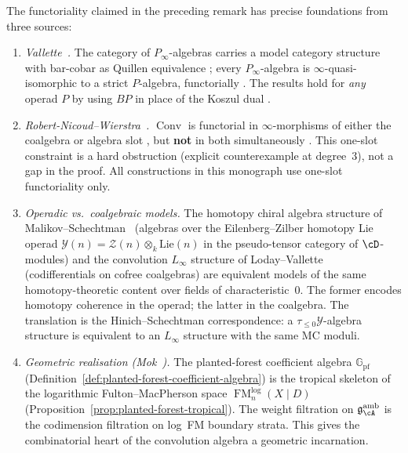 \begin{remark}
\label{rem:conv-functoriality-infrastructure}
The functoriality claimed in the preceding remark has precise
foundations from three sources:
\begin{enumerate}[label=\textup{(\roman*)}]
\item \emph{Vallette~\cite{Val16}.}
 The category of $P_\infty$-algebras carries a model category
 structure with bar-cobar as Quillen equivalence
 \cite[Theorem~2.1]{Val16}; every $P_\infty$-algebra is
 $\infty$-quasi-isomorphic to a strict $P$-algebra, functorially
 \cite[Theorem~1.2]{Val16}. The results hold for \emph{any}
 operad $P$ by using $BP$ in place of the Koszul dual
 \cite[\S1.6]{Val16}.
\item \emph{Robert-Nicoud--Wierstra~\cite{RNW19}.}
 $\operatorname{Conv}$ is functorial in $\infty$-morphisms of
 either the coalgebra or algebra slot
 \cite[Theorem~5.1]{RNW19}, but \textbf{not} in both
 simultaneously \cite[Theorem~6.6]{RNW19}. This one-slot
 constraint is a hard obstruction (explicit counterexample at
 degree~$3$), not a gap in the proof. All constructions in this
 monograph use one-slot functoriality only.
\item \emph{Operadic vs.\ coalgebraic models.}
 The homotopy chiral algebra structure of
 Malikov--Schechtman~\cite{MS24} (algebras over the Eilenberg--Zilber
 homotopy Lie operad
 $\mathcal{Y}(n) = \mathcal{Z}(n) \otimes_k \mathrm{Lie}(n)$
 in the pseudo-tensor category of $\cD$-modules) and the convolution
 $L_\infty$ structure of Loday--Vallette~\cite{LV12} (codifferentials
 on cofree coalgebras) are equivalent models of the same
 homotopy-theoretic content over fields of characteristic~$0$.
 The former encodes homotopy coherence in the operad; the latter
 in the coalgebra. The translation is the
 Hinich--Schechtman correspondence: a
 $\tau_{\leq 0}\mathcal{Y}$-algebra structure is equivalent to
 an $L_\infty$ structure with the same MC moduli.
\item \emph{Geometric realisation (Mok~\cite{Mok25}).}
 The planted-forest coefficient algebra $\mathbb{G}_{\mathrm{pf}}$
 (Definition~\ref{def:planted-forest-coefficient-algebra}) is the
 tropical skeleton of the logarithmic Fulton--MacPherson space
 $\operatorname{FM}_n^{\mathrm{log}}(X \mathbin{|} D)$
 (Proposition~\ref{prop:planted-forest-tropical}).
 The weight filtration on
 $\mathfrak{g}^{\mathrm{amb}}_{\cA}$ is the codimension
 filtration on log~FM boundary strata. This gives the
 combinatorial heart of the convolution algebra a geometric
 incarnation.
\end{enumerate}
\end{remark}

